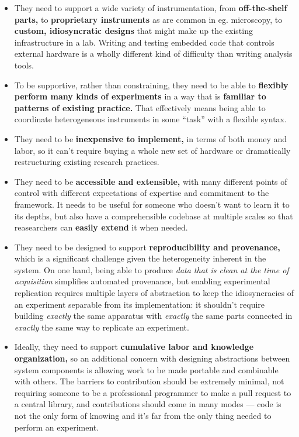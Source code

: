 \begin{itemize}

\item
  They need to support a wide variety of instrumentation, from
  \textbf{off-the-shelf parts,} to \textbf{proprietary instruments} as
  are common in eg. microscopy, to \textbf{custom, idiosyncratic
  designs} that might make up the existing infrastructure in a lab.
  Writing and testing embedded code that controls external hardware is a
  wholly different kind of difficulty than writing analysis tools.
\item
  To be supportive, rather than constraining, they need to be able to
  \textbf{flexibly perform many kinds of experiments} in a way that is
  \textbf{familiar to patterns of existing practice.} That effectively
  means being able to coordinate heterogeneous instruments in some
  ``task'' with a flexible syntax.
\item
  They need to be \textbf{inexpensive to implement,} in terms of both
  money and labor, so it can't require buying a whole new set of
  hardware or dramatically restructuring existing research practices.
\item
  They need to be \textbf{accessible and extensible,} with many
  different points of control with different expectations of expertise
  and commitment to the framework. It needs to be useful for someone who
  doesn't want to learn it to its depths, but also have a comprehensible
  codebase at multiple scales so that reasearchers can \textbf{easily
  extend} it when needed.
\item
  They need to be designed to support \textbf{reproducibility and
  provenance,} which is a significant challenge given the heterogeneity
  inherent in the system. On one hand, being able to produce \emph{data
  that is clean at the time of acquisition} simplifies automated
  provenance, but enabling experimental replication requires multiple
  layers of abstraction to keep the idiosyncracies of an experiment
  separable from its implementation: it shouldn't require building
  \emph{exactly} the same apparatus with \emph{exactly} the same parts
  connected in \emph{exactly} the same way to replicate an experiment.
\item
  Ideally, they need to support \textbf{cumulative labor and knowledge
  organization,} so an additional concern with designing abstractions
  between system components is allowing work to be made portable and
  combinable with others. The barriers to contribution should be
  extremely minimal, not requiring someone to be a professional
  programmer to make a pull request to a central library, and
  contributions should come in many modes --- code is not the only form
  of knowing and it's far from the only thing needed to perform an
  experiment.
\end{itemize}

